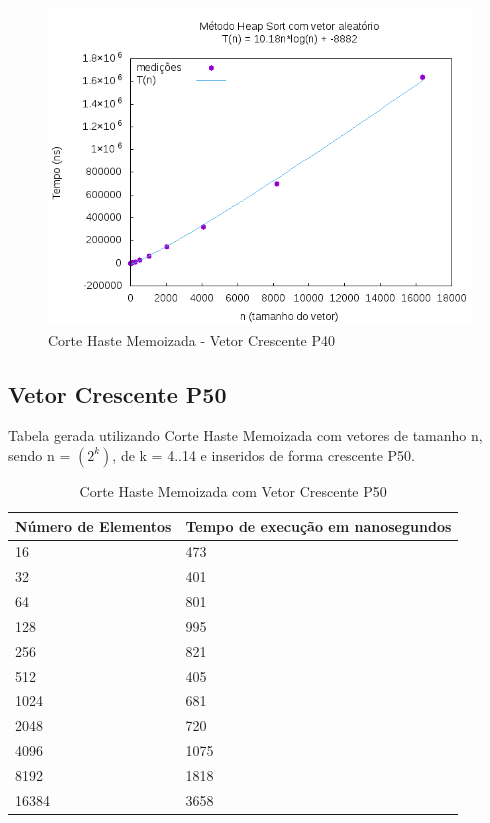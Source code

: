 \documentclass[12pt,a4paper,twoside]{report}
\begin{document}
\begin{figure}[H]
    \centering
    \includegraphics[width=0.7\linewidth]{graficos/HeapSort/vIntAleatorio/vIntAleatorio.png}
  \caption{Corte Haste Memoizada - Vetor Crescente P40}
\end{figure}




\subsection{Vetor Crescente P50}
Tabela gerada utilizando Corte Haste Memoizada com vetores de tamanho n, sendo n = $(2^k)$, de k = 4..14 e inseridos de forma crescente P50.
\begin{table}[H]
\centering
\caption{Corte Haste Memoizada com Vetor Crescente P50}
\label{my-label}
\begin{tabular}{|l|l|}
\hline
\multicolumn{1}{|c|}{\textbf{Número de Elementos}} & \multicolumn{1}{c|}{\textbf{Tempo de execução em nanosegundos}} \\ \hline
16 & 473 \\ \hline
32 & 401 \\ \hline
64 & 801 \\ \hline
128 & 995 \\ \hline
256 & 821 \\ \hline
512 & 405 \\ \hline
1024 & 681 \\ \hline
2048 & 720 \\ \hline
4096 & 1075 \\ \hline
8192 & 1818 \\ \hline
16384 & 3658 \\ \hline
\end{tabular}
\end{table}
\end{document}
